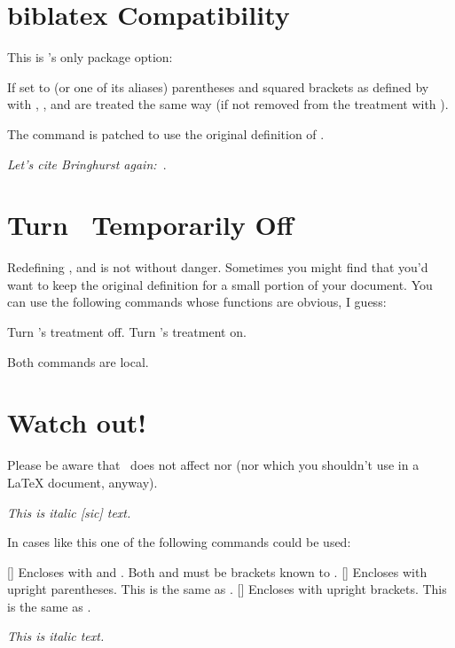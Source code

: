 \documentclass[load-preamble+]{cnltx-doc}
\begin{document}
\section{biblatex Compatibility}
This is \embrac's only package option:
\begin{options}
    If set to  (or one of its aliases) parentheses and squared
    brackets as defined by  with ,
    ,  and  are
    treated the same way (if not removed from the treatment with ).
   
    The command  is patched to use the original definition
    of .
\end{options}

\begin{example}
  \emph{Let's cite Bringhurst again:~\cite{bringhurst04}}.
\end{example}

\section{Turn \embrac\ Temporarily Off}
Redefining ,  and  is not without danger.
Sometimes you might find that you'd want to keep the original definition for a
small portion of your document.  You can use the following commands whose
functions are obvious, I guess:
\begin{commands}
    Turn \embrac's treatment off.
    Turn \embrac's treatment on.
\end{commands}
Both commands are local.

\section{Watch out!}
Please be aware that \embrac\ does not affect  nor  (nor
 which you shouldn't use in a \LaTeX{} document, anyway).
\begin{example}
  \itshape This is italic [sic] text.
\end{example}
In cases like this one of the following commands could be used:
\begin{commands}
  []
    Encloses  with  and . Both
     and  must be brackets known to \embrac.
  []
    Encloses  with upright parentheses.  This is
    the same as \Marg{(}\Marg{)}.
  []
    Encloses  with upright brackets.  This is
    the same as \Marg{[}\Marg{]}.
\end{commands}
\begin{example}
  \itshape This is italic  text.
\end{example}
\end{document}
